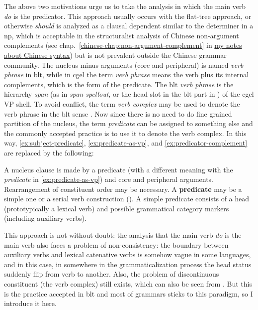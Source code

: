 \documentclass{article}
\newcommand*{\citechap}[1]{chap.~{#1}}
\newcommand*{\concept}[1]{\textbf{#1}}
\newcommand*{\term}[1]{\emph{#1}}
\newcommand*{\corpus}[1]{\emph{#1}}
\newcommand{\chinese}{\href{../Chinese/main.pdf}{my notes about Chinese syntax}}
\begin{document}
The above two motivations urge us to take 
the analysis in which the main verb \corpus{do} is the predicator.
This approach usually occurs with the flat-tree approach,
or otherwise \corpus{should} is analyzed as a clausal dependent similar to the determiner in a \ac{np},
which is acceptable in the structuralist analysis of Chinese non-argument complements 
(see \citechap{\ref{chinese-chap:non-argument-complement}} in \chinese)
but is not prevalent outside the Chinese grammar community.
The nucleus minus arguments (core and peripheral) is named \term{verb phrase} in \ac{blt},
while in \ac{cgel} the term \term{verb phrase} means the verb plus its internal complements,
which is the form of the predicate.
The \ac{blt} \term{verb phrase} is the hierarchy \emph{span} 
(as in \term{span spellout}, or the head slot in the \ac{blt} part in ) 
of the \ac{cgel} VP shell.
To avoid conflict, 
the term \term{verb complex} may be used to denote the verb phrase in the \ac{blt} sense
\citep{hockett1948potawatomi,Friesen2017,Wilbur2014}.
Now since there is no need to do fine grained partition of the nucleus,
the term \term{predicate} can be assigned to something else 
and the commonly accepted practice is to use it to denote the verb complex.
In this way, \eqref{ex:subject-predicate}, \eqref{ex:predicate-as-vp}, and \eqref{ex:predicator-complement}
are replaced by the following:
\begin{exe}
    \ex A nucleus clause is made by a predicate
    (with a different meaning with the \term{predicate} in \eqref{ex:predicate-as-vp}) 
    and core and peripheral arguments.
    Rearrangement of constituent order may be necessary.
    \ex A \concept{predicate} may be a simple one or a serial verb construction 
    ().
    \ex A simple predicate consists of a head (prototypically a lexical verb) and  
    possible grammatical category markers (including auxiliary verbs). 
\end{exe}

This approach is not without doubt: the analysis that the main verb \corpus{do} is the main verb 
also faces a problem of non-consistency:
the boundary between auxiliary verbs and lexical catenative verbs %
is somehow vague in some languages, 
and in this case, in somewhere in the grammaticalization process the head status 
suddenly flip from verb to another.
Also, the problem of discontinuous constituent (the verb complex)
still exists, which can also be seen from .
But this is the practice accepted in \ac{blt} and most of grammars sticks to this paradigm,
so I introduce it here.
\end{document}
